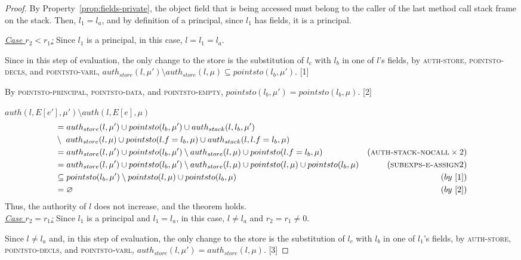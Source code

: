 \documentclass{llncs}
\begin{document}
\begin{proof}
By Property~\ref{prop:fields-private}, the object field that is being accessed must belong to the caller of the last method call stack frame on the stack. Then, $l_1 = l_a$, and by definition of a principal, since $l_1$ has fields, it is a principal.

\noindent\underline{\underline{\textit{Case $r_2 < r_1$:}}} Since $l_1$ is a principal, in this case, $l = l_1 = l_a$.

Since in this step of evaluation, the only change to the store is the substitution of $l_c$ with $l_b$ in one of $l$'s fields, by \textsc{auth-store}, \textsc{pointsto-decls}, and \textsc{pointsto-varl}, $auth_{store}(l, \mu') \setminus auth_{store}(l, \mu) \subseteq pointsto(l_b, \mu')$. [1]

By \textsc{pointsto-principal}, \textsc{pointsto-data}, and \textsc{pointsto-empty}, $pointsto(l_b, \mu') = pointsto(l_b, \mu)$. \hspace{12pt} [2]

\noindent$auth(l, E[e'], \mu') \setminus auth(l, E[e], \mu)$
\vspace{-7pt}
\begin{align*}
&= auth_{store}(l, \mu') \cup pointsto(l_b, \mu') \cup auth_{stack}(l, l_b, \mu')\\
&\setminus~auth_{store}(l, \mu) \cup pointsto(l.f = l_b, \mu) \cup auth_{stack}(l, l.f = l_b, \mu)\\
&= auth_{store}(l, \mu') \cup pointsto(l_b, \mu') \setminus auth_{store}(l, \mu) \cup pointsto(l.f = l_b, \mu) & (\textsc{auth-stack-nocall} \times 2)\\
&= auth_{store}(l, \mu') \cup pointsto(l_b, \mu') \setminus auth_{store}(l, \mu) \cup pointsto(l, \mu) \cup pointsto(l_b, \mu) & (\textsc{subexps-e-assign2})\\
&\subseteq pointsto(l_b, \mu') \setminus pointsto(l, \mu) \cup pointsto(l_b, \mu) & (by~[1])\\
&= \varnothing & (by~[2])
\end{align*}
Thus, the authority of $l$ does not increase, and the theorem holds.\\

\noindent\underline{\underline{\textit{Case $r_2 = r_1$:}}} Since $l_1$ is a principal and $l_1 = l_a$, in this case, $l \neq l_a$ and $r_2 = r_1 \neq 0$.

Since $l \neq l_a$ and, in this step of evaluation, the only change to the store is the substitution of $l_c$ with $l_b$ in one of $l_1$'s fields, by \textsc{auth-store}, \textsc{pointsto-decls}, and \textsc{pointsto-varl}, $auth_{store}(l, \mu') = auth_{store}(l, \mu)$. [3]


\end{proof}
\end{document}
